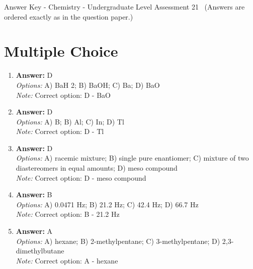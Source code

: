\documentclass[12pt]{article}
\begin{document}
\begin{center}
Answer Key - Chemistry - Undergraduate Level Assessment 21 \
\small (Answers are ordered exactly as in the question paper.)
\end{center}

\section*{Multiple Choice}
\begin{enumerate}[label=\arabic*.]
\item \textbf{Answer:} D
\\ \textit{Options:} A) BaH 2; B) BaOH; C) Ba; D) BaO
\\ \textit{Note:} Correct option: D - BaO
\item \textbf{Answer:} D
\\ \textit{Options:} A) B; B) Al; C) In; D) Tl
\\ \textit{Note:} Correct option: D - Tl
\item \textbf{Answer:} D
\\ \textit{Options:} A) racemic mixture; B) single pure enantiomer; C) mixture of two diastereomers in equal amounts; D) meso compound
\\ \textit{Note:} Correct option: D - meso compound
\item \textbf{Answer:} B
\\ \textit{Options:} A) 0.0471 Hz; B) 21.2 Hz; C) 42.4 Hz; D) 66.7 Hz
\\ \textit{Note:} Correct option: B - 21.2 Hz
\item \textbf{Answer:} A
\\ \textit{Options:} A) hexane; B) 2-methylpentane; C) 3-methylpentane; D) 2,3-dimethylbutane
\\ \textit{Note:} Correct option: A - hexane
\end{enumerate}
\end{document}
